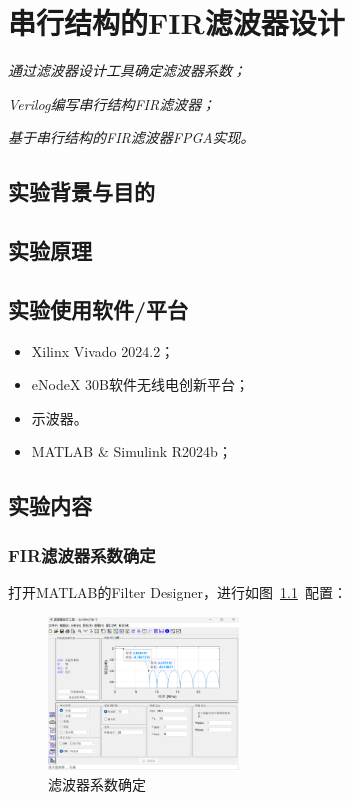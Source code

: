 \chapter{串行结构的FIR滤波器设计}
\begin{introduction}
    \item \textit{通过滤波器设计工具确定滤波器系数；}
    \item \textit{Verilog编写串行结构FIR滤波器；}
    \item \textit{基于串行结构的FIR滤波器FPGA实现。}
\end{introduction}
\section{实验背景与目的}

\section{实验原理}

\section{实验使用软件/平台}
\begin{itemize}
    \item Xilinx Vivado 2024.2；
    \item eNodeX 30B软件无线电创新平台；
    \item 示波器。
    \item MATLAB \& Simulink R2024b；
  \end{itemize}
\section{实验内容}
\subsection{FIR滤波器系数确定}
打开MATLAB的\textcolor{b!50}{Filter Designer}，进行如图~\ref{fig:filterdesign}~配置：
\begin{figure}
    \includegraphics[width=0.45\textwidth]{figure/exp6/filter_designer.png}
    \caption{滤波器系数确定}
    \label{fig:filterdesign}
\end{figure}


